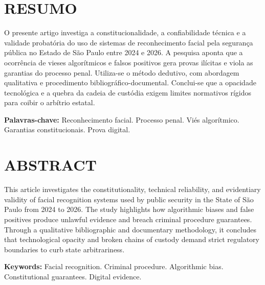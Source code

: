 \documentclass[12pt,a4paper]{article}
\begin{document}
\section*{RESUMO}

O presente artigo investiga a constitucionalidade, a confiabilidade técnica e a validade probatória do uso de sistemas de reconhecimento facial pela segurança pública no Estado de São Paulo entre 2024 e 2026. A pesquisa aponta que a ocorrência de vieses algorítmicos e falsos positivos gera provas ilícitas e viola as garantias do processo penal. Utiliza-se o método dedutivo, com abordagem qualitativa e procedimento bibliográfico-documental. Conclui-se que a opacidade tecnológica e a quebra da cadeia de custódia exigem limites normativos rígidos para coibir o arbítrio estatal.

\vspace{0.5cm}
\textbf{Palavras-chave:} Reconhecimento facial. Processo penal. Viés algorítmico. Garantias constitucionais. Prova digital.

\newpage

\section*{ABSTRACT}

This article investigates the constitutionality, technical reliability, and evidentiary validity of facial recognition systems used by public security in the State of São Paulo from 2024 to 2026. The study highlights how algorithmic biases and false positives produce unlawful evidence and breach criminal procedure guarantees. Through a qualitative bibliographic and documentary methodology, it concludes that technological opacity and broken chains of custody demand strict regulatory boundaries to curb state arbitrariness.

\vspace{0.5cm}
\textbf{Keywords:} Facial recognition. Criminal procedure. Algorithmic bias. Constitutional guarantees. Digital evidence.

\newpage

\end{document}
